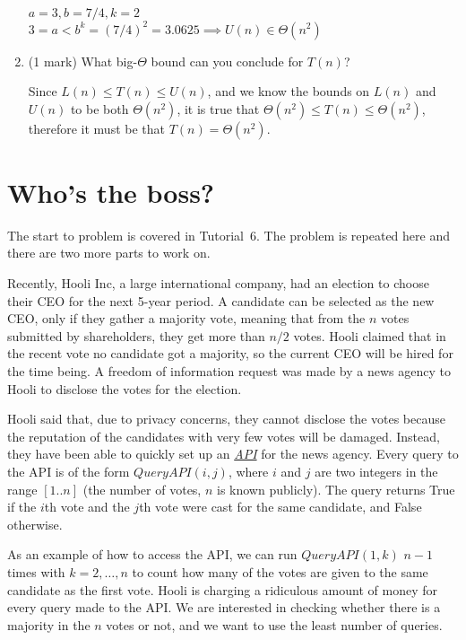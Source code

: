 \documentclass[11pt]{article}
\begin{document}
\begin{enumerate}
\begin{soln}
$a=3, b=7/4, k=2$ \\
$3 = a < b^k = (7/4)^2 = 3.0625 \implies U(n) \in \Theta(n^2)$
\end{soln}

\item (1 mark)
What big-$\Theta$ bound can you conclude for $T(n)$?

\begin{soln}
Since $L(n) \leq T(n) \leq U(n)$, and we know the bounds on $L(n)$ and $U(n)$ to be both $\Theta(n^2)$, it is true that $\Theta(n^2) \leq T(n) \leq \Theta(n^2)$, therefore it must be that $T(n)=\Theta(n^2)$.
\end{soln}

\end{enumerate}


\newpage

\section{Who's the boss?}
The start to problem is covered in Tutorial~6. The problem is
repeated here and there are two more parts to work on.

        Recently, Hooli Inc, a large international company, had an election to choose their CEO for the next 5-year period. A candidate can be selected as the new CEO, only if they gather a majority vote, meaning that from the $n$ votes submitted by shareholders, they get more than $n/2$ votes. Hooli claimed that in the recent vote no candidate got a majority, so the current CEO will be hired for the time being. A freedom of information request was made by a news agency to Hooli to disclose the votes for the election.

        Hooli said that, due to privacy concerns, they cannot disclose the votes because the reputation of the candidates with very few votes will be damaged. Instead, they have been able to quickly set up an \href{https://www.howtogeek.com/343877/what-is-an-api/}{\color{blue} \textit{API}} for the news agency. Every query to the API is
        of the form $QueryAPI(i,j)$, where $i$ and $j$ are two integers in the range $[1..n]$ (the number of votes, $n$ is known publicly). The query returns True if the $i$th vote and the $j$th vote were cast for the same candidate, and False otherwise.

As an example of how to access the API, we can run $QueryAPI(1,k)$ $n-1$ times with $k=2,\dots,n$ to count how many of the votes are given to the same candidate as the first vote. Hooli is charging a ridiculous amount of money for every query made to the API. We are interested in checking whether there is a majority in the $n$ votes or not, and we want to use the least number of queries.
\end{document}
